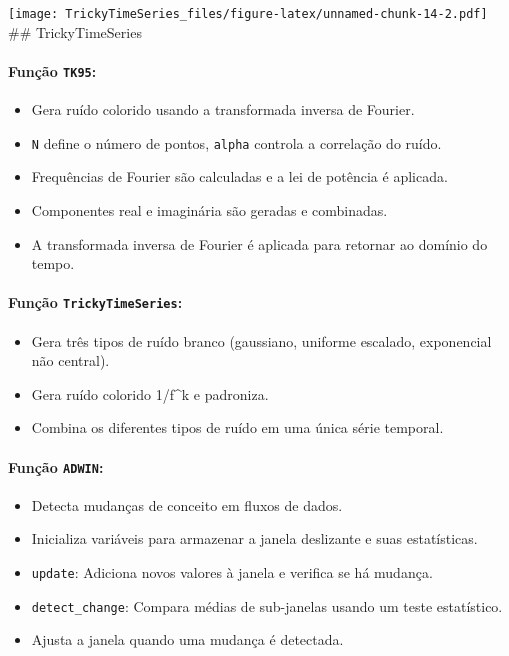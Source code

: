 \documentclass[
]{article}
\providecommand{\tightlist}{%
  \setlength{\itemsep}{0pt}\setlength{\parskip}{0pt}}
\begin{document}
\texttt{[image: TrickyTimeSeries\_files/figure-latex/unnamed-chunk-14-2.pdf]}
\#\# TrickyTimeSeries

\hypertarget{funuxe7uxe3o-tk95}{%
\paragraph{\texorpdfstring{Função
\texttt{TK95}:}{Função TK95:}}\label{funuxe7uxe3o-tk95}}

\begin{itemize}
\tightlist
\item
  Gera ruído colorido usando a transformada inversa de Fourier.
\item
  \texttt{N} define o número de pontos, \texttt{alpha} controla a
  correlação do ruído.
\item
  Frequências de Fourier são calculadas e a lei de potência é aplicada.
\item
  Componentes real e imaginária são geradas e combinadas.
\item
  A transformada inversa de Fourier é aplicada para retornar ao domínio
  do tempo.
\end{itemize}

\hypertarget{funuxe7uxe3o-trickytimeseries}{%
\paragraph{\texorpdfstring{Função
\texttt{TrickyTimeSeries}:}{Função TrickyTimeSeries:}}\label{funuxe7uxe3o-trickytimeseries}}

\begin{itemize}
\tightlist
\item
  Gera três tipos de ruído branco (gaussiano, uniforme escalado,
  exponencial não central).
\item
  Gera ruído colorido 1/f\^{}k e padroniza.
\item
  Combina os diferentes tipos de ruído em uma única série temporal.
\end{itemize}

\hypertarget{funuxe7uxe3o-adwin}{%
\paragraph{\texorpdfstring{Função
\texttt{ADWIN}:}{Função ADWIN:}}\label{funuxe7uxe3o-adwin}}

\begin{itemize}
\tightlist
\item
  Detecta mudanças de conceito em fluxos de dados.
\item
  Inicializa variáveis para armazenar a janela deslizante e suas
  estatísticas.
\item
  \texttt{update}: Adiciona novos valores à janela e verifica se há
  mudança.
\item
  \texttt{detect\_change}: Compara médias de sub-janelas usando um teste
  estatístico.
\item
  Ajusta a janela quando uma mudança é detectada.
\end{itemize}
\end{document}
